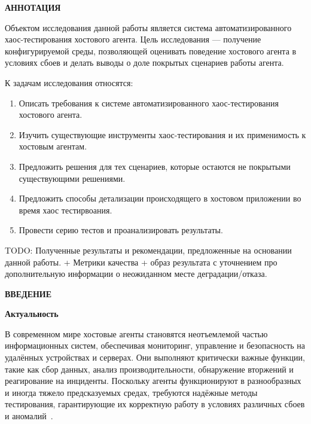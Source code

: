 \newpage
\begin{center}
  \textbf{\large АННОТАЦИЯ}
\end{center}

Объектом исследования данной работы является система автоматизированного хаос-тестирования хостового агента.
Цель исследования — получение конфигурируемой среды, позволяющей оценивать поведение хостового агента
в условиях сбоев и делать выводы о доле покрытых сценариев работы агента.

К задачам исследования относятся:
\begin{enumerate}
  \item Описать требования к системе автоматизированного хаос-тестирования хостового агента.
  \item Изучить существующие инструменты хаос-тестирования и их применимость к хостовым агентам.
  \item Предложить решения для тех сценариев, которые остаются не покрытыми существующими решениями.
  \item Предложить способы детализации происходящего в хостовом приложении во время хаос тестирвоания.
  \item Провести серию тестов и проанализировать результаты.
\end{enumerate}

TODO: Полученные результаты и рекомендации, предложенные на основании данной работы.
+ Метрики качества + образ результата с уточнением про дополнительную информации о неожиданном месте деградации/отказа.

\onehalfspacing
\setcounter{page}{2}

\newpage
\renewcommand{\contentsname}{\centerline{\large СОДЕРЖАНИЕ}}
\tableofcontents

\newpage
\begin{center}
  \textbf{\large ВВЕДЕНИЕ}
\end{center}

\textbf{Актуальность}

В современном мире хостовые агенты становятся неотъемлемой частью информационных систем, обеспечивая мониторинг,
управление и безопасность на удалённых устройствах и серверах.
Они выполняют критически важные функции, такие как сбор данных, анализ производительности, обнаружение вторжений
и реагирование на инциденты.
Поскольку агенты функционируют в разнообразных и иногда тяжело предсказуемых средах,
требуются надёжные методы тестирования, гарантирующие их корректную работу в условиях различных сбоев и аномалий~\cite{Monperrus2017}.

